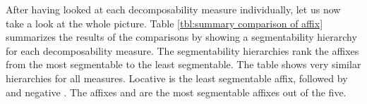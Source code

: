                                                                
After having looked at each decomposability measure individually, let us now take a look at the whole picture. Table \ref{tbl:summary comparison of affix} summarizes the results of the comparisons by showing a segmentability hierarchy for each decomposability measure. The segmentability hierarchies rank the affixes from the most segmentable to the least segmentable. The table shows very similar hierarchies for all measures. Locative  is the least segmentable affix, followed by  and negative . The affixes  and  are the most segmentable affixes out of the five. 


\begin{table}
	\caption{Segmentability hierarchies for each decomposability measure}
	\label{tbl:summary comparison of affix}
	
	
\end{table}



